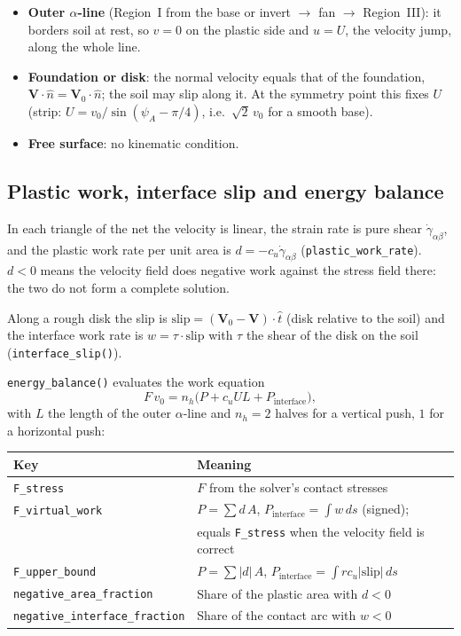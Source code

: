 \documentclass[11pt,a4paper]{article}
\begin{document}
\begin{itemize}
  \item \textbf{Outer $\alpha$-line} (Region~I from the base or invert
        $\to$ fan $\to$ Region~III): it borders soil at rest, so
        $v = 0$ on the plastic side and $u = U$, the velocity jump,
        along the whole line.
  \item \textbf{Foundation or disk}: the normal velocity equals that of
        the foundation, $\mathbf V\cdot\hat n = \mathbf V_0\cdot\hat n$;
        the soil may slip along it.  At the symmetry point this fixes
        $U$ (strip: $U = v_0/\sin(\psi_A - \pi/4)$, i.e.\ $\sqrt2\,v_0$
        for a smooth base).
  \item \textbf{Free surface}: no kinematic condition.
\end{itemize}

\subsection{Plastic work, interface slip and energy balance}

In each triangle of the net the velocity is linear, the strain rate is
pure shear $\dot\gamma_{\alpha\beta}$, and the plastic work rate per
unit area is $d = -c_u\dot\gamma_{\alpha\beta}$
(\texttt{plastic\_work\_rate}).  $d < 0$ means the velocity field does
negative work against the stress field there: the two do not form a
complete solution.

Along a rough disk the slip is
$\text{slip} = (\mathbf V_0 - \mathbf V)\cdot\hat t$ (disk relative to
the soil) and the interface work rate is $w = \tau\cdot\text{slip}$
with $\tau$ the shear of the disk on the soil
(\texttt{interface\_slip()}).

\texttt{energy\_balance()} evaluates the work equation
\begin{equation}
  F\,v_0 = n_h\bigl(P + c_u U L + P_\text{interface}\bigr),
\end{equation}
with $L$ the length of the outer $\alpha$-line and $n_h = 2$ halves for a
vertical push, $1$ for a horizontal push:

\begin{center}
\begin{tabular}{ll}
\toprule
Key & Meaning \\
\midrule
\texttt{F\_stress} & $F$ from the solver's contact stresses \\
\texttt{F\_virtual\_work} & $P = \sum d\,A$, $P_\text{interface} = \int w\,ds$ (signed); \\
 & equals \texttt{F\_stress} when the velocity field is correct \\
\texttt{F\_upper\_bound} & $P = \sum |d|\,A$, $P_\text{interface} = \int r c_u|\text{slip}|\,ds$ \\
\texttt{negative\_area\_fraction} & Share of the plastic area with $d < 0$ \\
\texttt{negative\_interface\_fraction} & Share of the contact arc with $w < 0$ \\
\bottomrule
\end{tabular}
\end{center}
\end{document}
